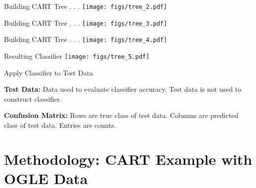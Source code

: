 \documentclass[12pt]{beamer}
\begin{document}
\begin{frame}{Building CART Tree . . .}
\texttt{[image: figs/tree\_2.pdf]}
\end{frame}

\begin{frame}{Building CART Tree . . .}
\texttt{[image: figs/tree\_3.pdf]}
\end{frame}

\begin{frame}{Building CART Tree . . .}
\texttt{[image: figs/tree\_4.pdf]}
\end{frame}

\begin{frame}{Resulting Classifier}
\texttt{[image: figs/tree\_5.pdf]}
\end{frame}

\begin{frame}{Apply Classifier to Test Data}

\textbf{Test Data:} Data used to evaluate classifier accuracy. Test data is not used to construct classifier.

\vspace{.1in}

\textbf{Confusion Matrix:} Rows are true class of test data. Columns are predicted class of test data. Entries are counts.

\vspace{.2in}

\begin{center}

\end{center}

\end{frame}




\section{Methodology: CART Example with OGLE Data}
\end{document}
